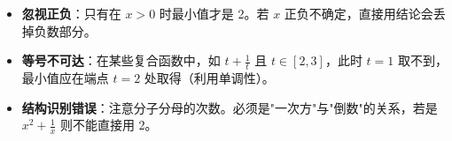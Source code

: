 \begin{trapbox}
\begin{itemize}
    \item \textbf{忽视正负}：只有在 $x > 0$ 时最小值才是 2。若 $x$ 正负不确定，直接用结论会丢掉负数部分。
    \item \textbf{等号不可达}：在某些复合函数中，如 $t + \frac{1}{t}$ 且 $t \in [2, 3]$，此时 $t=1$ 取不到，最小值应在端点 $t=2$ 处取得（利用单调性）。
    \item \textbf{结构识别错误}：注意分子分母的次数。必须是"一次方"与"倒数"的关系，若是 $x^2 + \frac{1}{x}$ 则不能直接用 2。
\end{itemize}
\end{trapbox}